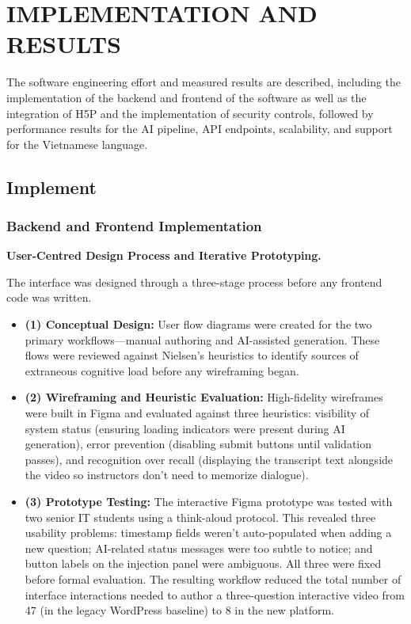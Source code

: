 \chapter{IMPLEMENTATION AND RESULTS}
\label{ch:implementation}

The software engineering effort and measured results are described, including the implementation of the backend and frontend of the software as well as the integration of H5P and the implementation of security controls, followed by performance results for the AI pipeline, API endpoints, scalability, and support for the Vietnamese language.

\section{Implement}

\subsection{Backend and Frontend Implementation}

\textbf{User-Centred Design Process and Iterative Prototyping.}

The interface was designed through a three-stage process before any frontend code was written.
\begin{itemize}
    \item \textbf{(1) Conceptual Design:} User flow diagrams were created for the two primary workflows---manual authoring and AI-assisted generation. These flows were reviewed against Nielsen's heuristics to identify sources of extraneous cognitive load before any wireframing began.
    \item \textbf{(2) Wireframing and Heuristic Evaluation:} High-fidelity wireframes were built in Figma and evaluated against three heuristics: visibility of system status (ensuring loading indicators were present during AI generation), error prevention (disabling submit buttons until validation passes), and recognition over recall (displaying the transcript text alongside the video so instructors don't need to memorize dialogue).
    \item \textbf{(3) Prototype Testing:} The interactive Figma prototype was tested with two senior IT students using a think-aloud protocol. This revealed three usability problems: timestamp fields weren't auto-populated when adding a new question; AI-related status messages were too subtle to notice; and button labels on the injection panel were ambiguous. All three were fixed before formal evaluation. The resulting workflow reduced the total number of interface interactions needed to author a three-question interactive video from 47 (in the legacy WordPress baseline) to 8 in the new platform.
\end{itemize}

